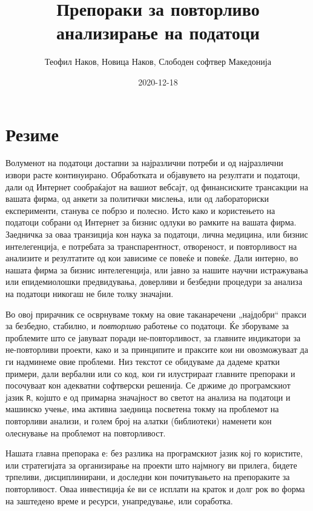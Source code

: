 \documentclass[
]{book}
\title{Препораки за повторливо анализирање на податоци}
\author{Теофил Наков, Новица Наков, Слободен софтвер Македонија}
\date{2020-12-18}
\begin{document}
\maketitle

{
\setcounter{tocdepth}{1}
\tableofcontents
}
\hypertarget{ux440ux435ux437ux438ux43cux435}{%
\chapter*{Резиме}\label{ux440ux435ux437ux438ux43cux435}}

Волуменот на податоци достапни за најразлични потреби и од најразлични извори расте континуирано. Обработката и објавувето на резултати и податоци, дали од Интернет сообраќајот на вашиот вебсајт, од финансиските трансакции на вашата фирма, од анкети за политички мислења, или од лабораториски експерименти, станува се побрзо и полесно. Исто како и користењето на податоци собрани од Интернет за бизнис одлуки во рамките на вашата фирма. Заедничка за оваа транзиција кон наука за податоци, лична медицина, или бизнис интелегенција, е потребата за транспарентност, отвореност, и повторливост на анализите и резултатите од кои зависиме се повеќе и повеќе. Дали интерно, во нашата фирма за бизнис интелегенција, или јавно за нашите научни истражувања или епидемиолошки предвидувања, доверливи и безбедни процедури за анализа на податоци никогаш не биле толку значајни.

Во овој прирачник се осврнуваме токму на овие таканаречени „најдобри`` пракси за безбедно, стабилно, и \emph{повторливо} работење со податоци. Ќе зборуваме за проблемите што се јавуваат поради не-повторливост, за главните индикатори за не-повторливи проекти, како и за принципите и праксите кои ни овозможуваат да ги надминеме овие проблеми. Низ текстот се обидуваме да дадеме кратки примери, дали вербални или со код, кои ги илустрираат главните препораки и посочуваат кон адекватни софтверски решенија. Се држиме до програмскиот јазик \texttt{R}, којшто е од примарна значајност во светот на анализа на податоци и машинско учење, има активна заедница посветена токму на проблемот на повторливи анализи, и голем број на алатки (библиотеки) наменети кон олеснување на проблемот на повторливост.

Нашата главна препорака е: без разлика на програмскиот јазик кој го користите, или стратегијата за организирање на проекти што најмногу ви прилега, бидете трпеливи, дисциплинирани, и доследни кон почитувањето на препораките за повторливост. Оваа инвестиција ќе ви се исплати на краток и долг рок во форма на заштедено време и ресурси, унапредување, или соработка.
\end{document}
